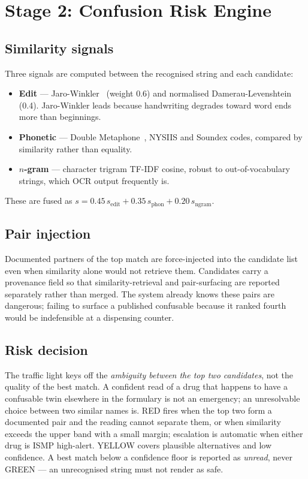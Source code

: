 \documentclass[conference]{IEEEtran}
\begin{document}
\section{Stage 2: Confusion Risk Engine}\label{sec:stage2}

\subsection{Similarity signals}
Three signals are computed between the recognised string and each candidate:

\begin{itemize}
\item \textbf{Edit} --- Jaro-Winkler~\cite{winkler1990string} (weight 0.6) and
normalised Damerau-Levenshtein~\cite{levenshtein1966binary} (0.4). Jaro-Winkler
leads because handwriting degrades toward word ends more than beginnings.
\item \textbf{Phonetic} --- Double Metaphone~\cite{philips2000metaphone},
NYSIIS and Soundex codes, compared by similarity rather than equality.
\item \textbf{$n$-gram} --- character trigram TF-IDF cosine, robust to
out-of-vocabulary strings, which OCR output frequently is.
\end{itemize}

These are fused as $s = 0.45\,s_{\text{edit}} + 0.35\,s_{\text{phon}} +
0.20\,s_{\text{ngram}}$.

\subsection{Pair injection}
Documented partners of the top match are force-injected into the candidate list
even when similarity alone would not retrieve them. Candidates carry a
provenance field so that similarity-retrieval and pair-surfacing are reported
separately rather than merged. The system already knows these pairs are
dangerous; failing to surface a published confusable because it ranked fourth
would be indefensible at a dispensing counter.

\subsection{Risk decision}
The traffic light keys off the \emph{ambiguity between the top two candidates},
not the quality of the best match. A confident read of a drug that happens to
have a confusable twin elsewhere in the formulary is not an emergency; an
unresolvable choice between two similar names is. RED fires when the
top two form a documented pair and the reading cannot separate them, or when
similarity exceeds the upper band with a small margin; escalation is automatic
when either drug is ISMP high-alert. YELLOW covers plausible
alternatives and low confidence. A best match below a confidence floor is
reported as \emph{unread}, never GREEN --- an unrecognised string must
not render as safe.
\end{document}
